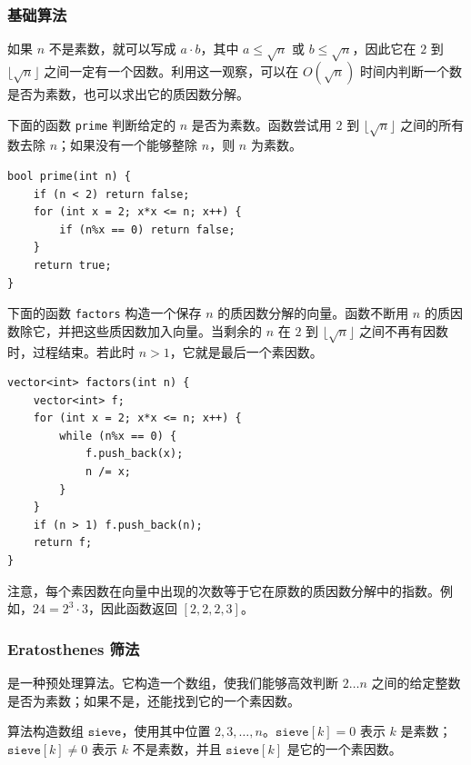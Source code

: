 \subsubsection{基础算法}

如果 $n$ 不是素数，就可以写成 $a \cdot b$，其中 $a \le \sqrt n$ 或 $b \le \sqrt n$，因此它在 $2$ 到 $\lfloor \sqrt n \rfloor$ 之间一定有一个因数。利用这一观察，可以在 $O(\sqrt n)$ 时间内判断一个数是否为素数，也可以求出它的质因数分解。

下面的函数 \texttt{prime} 判断给定的 $n$ 是否为素数。函数尝试用 $2$ 到 $\lfloor \sqrt n \rfloor$ 之间的所有数去除 $n$；如果没有一个能够整除 $n$，则 $n$ 为素数。

\begin{lstlisting}
bool prime(int n) {
    if (n < 2) return false;
    for (int x = 2; x*x <= n; x++) {
        if (n%x == 0) return false;
    }
    return true;
}
\end{lstlisting}

\noindent
下面的函数 \texttt{factors} 构造一个保存 $n$ 的质因数分解的向量。函数不断用 $n$ 的质因数除它，并把这些质因数加入向量。当剩余的 $n$ 在 $2$ 到 $\lfloor \sqrt n \rfloor$ 之间不再有因数时，过程结束。若此时 $n>1$，它就是最后一个素因数。

\begin{lstlisting}
vector<int> factors(int n) {
    vector<int> f;
    for (int x = 2; x*x <= n; x++) {
        while (n%x == 0) {
            f.push_back(x);
            n /= x;
        }
    }
    if (n > 1) f.push_back(n);
    return f;
}
\end{lstlisting}

注意，每个素因数在向量中出现的次数等于它在原数的质因数分解中的指数。例如，$24=2^3 \cdot 3$，因此函数返回 $[2,2,2,3]$。

\subsubsection{Eratosthenes 筛法}


是一种预处理算法。它构造一个数组，使我们能够高效判断 $2 \ldots n$ 之间的给定整数是否为素数；如果不是，还能找到它的一个素因数。

算法构造数组 $\texttt{sieve}$，使用其中位置 $2,3,\ldots,n$。$\texttt{sieve}[k]=0$ 表示 $k$ 是素数；$\texttt{sieve}[k] \neq 0$ 表示 $k$ 不是素数，并且 $\texttt{sieve}[k]$ 是它的一个素因数。

